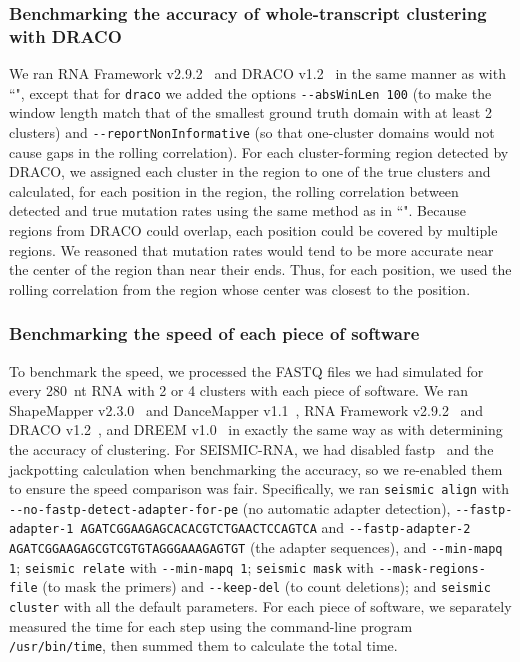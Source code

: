 \documentclass[11pt]{article}
\begin{document}
\subsubsection{Benchmarking the accuracy of whole-transcript clustering with DRACO}
\label{benchmark-whole-draco}

We ran RNA Framework v2.9.2~\cite{Incarnato2018} and DRACO v1.2~\cite{Morandi2021} in the same manner as with ``", except that for \verb|draco| we added the options \verb|--absWinLen 100| (to make the window length match that of the smallest ground truth domain with at least 2 clusters) and \verb|--reportNonInformative| (so that one-cluster domains would not cause gaps in the rolling correlation).
For each cluster-forming region detected by DRACO, we assigned each cluster in the region to one of the true clusters and calculated, for each position in the region, the rolling correlation between detected and true mutation rates using the same method as in ``".
Because regions from DRACO could overlap, each position could be covered by multiple regions.
We reasoned that mutation rates would tend to be more accurate near the center of the region than near their ends.
Thus, for each position, we used the rolling correlation from the region whose center was closest to the position.

\subsubsection{Benchmarking the speed of each piece of software}

To benchmark the speed, we processed the FASTQ files we had simulated for every 280~nt RNA with 2 or 4 clusters with each piece of software.
We ran ShapeMapper v2.3.0~\cite{Busan2018} and DanceMapper v1.1~\cite{Olson2022}, RNA Framework v2.9.2~\cite{Incarnato2018} and DRACO v1.2~\cite{Morandi2021}, and DREEM v1.0~\cite{Tomezsko2020} in exactly the same way as with determining the accuracy of clustering.
For SEISMIC-RNA, we had disabled fastp~\cite{Chen2018} and the jackpotting calculation when benchmarking the accuracy, so we re-enabled them to ensure the speed comparison was fair.
Specifically, we ran \verb|seismic align| with \verb|--no-fastp-detect-adapter-for-pe| (no automatic adapter detection), \verb|--fastp-adapter-1 AGATCGGAAGAGCACACGTCTGAACTCCAGTCA| and \verb|--fastp-adapter-2 AGATCGGAAGAGCGTCGTGTAGGGAAAGAGTGT| (the adapter sequences), and \verb|--min-mapq 1|; \verb|seismic relate| with \verb|--min-mapq 1|; \verb|seismic mask| with \verb|--mask-regions-file| (to mask the primers) and \verb|--keep-del| (to count deletions); and \verb|seismic cluster| with all the default parameters.
For each piece of software, we separately measured the time for each step using the command-line program \verb|/usr/bin/time|, then summed them to calculate the total time.
\end{document}
